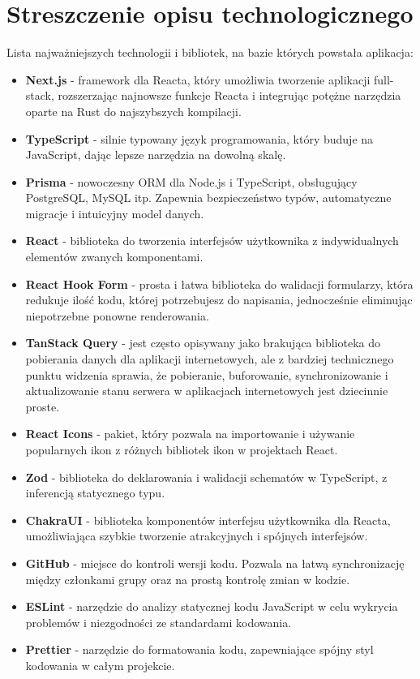 \documentclass{article}
\begin{document}
    \section{Streszczenie opisu technologicznego}
    Lista najważniejszych technologii i bibliotek, na bazie których powstała aplikacja:
    \begin{itemize}
        \item \textbf{Next.js} - framework dla Reacta, który umożliwia tworzenie aplikacji full-stack, rozszerzając najnowsze funkcje Reacta i integrując potężne narzędzia oparte na Rust do najszybszych kompilacji.
        \item \textbf{TypeScript} - silnie typowany język programowania, który buduje na JavaScript, dając lepsze narzędzia na dowolną skalę.
        \item \textbf{Prisma} - nowoczesny ORM dla Node.js i TypeScript, obsługujący PostgreSQL, MySQL itp. Zapewnia bezpieczeństwo typów, automatyczne migracje i intuicyjny model danych.
        \item \textbf{React} - biblioteka do tworzenia interfejsów użytkownika z indywidualnych elementów zwanych komponentami. 
        \item \textbf{React Hook Form} - prosta i łatwa biblioteka do walidacji formularzy, która redukuje ilość kodu, której potrzebujesz do napisania, jednocześnie eliminując niepotrzebne ponowne renderowania.
        \item \textbf{TanStack Query} - jest często opisywany jako brakująca biblioteka do pobierania danych dla aplikacji internetowych, ale z bardziej technicznego punktu widzenia sprawia, że pobieranie, buforowanie, synchronizowanie i aktualizowanie stanu serwera w aplikacjach internetowych jest dziecinnie proste.
        \item \textbf{React Icons} - pakiet, który pozwala na importowanie i używanie popularnych ikon z różnych bibliotek ikon w projektach React.
        \item \textbf{Zod} - biblioteka do deklarowania i walidacji schematów w TypeScript, z inferencją statycznego typu. 
        \item \textbf{ChakraUI} - biblioteka komponentów interfejsu użytkownika dla Reacta, umożliwiająca szybkie tworzenie atrakcyjnych i spójnych interfejsów.
        \item \textbf{GitHub} -  miejsce do kontroli wersji kodu. Pozwala na łatwą synchronizację między członkami grupy oraz na prostą kontrolę zmian w kodzie.
        \item \textbf{ESLint} -  narzędzie do analizy statycznej kodu JavaScript w celu wykrycia problemów i niezgodności ze standardami kodowania.
        \item \textbf{Prettier} -  narzędzie do formatowania kodu, zapewniające spójny styl kodowania w całym projekcie.
    \end{itemize}
\end{document}
